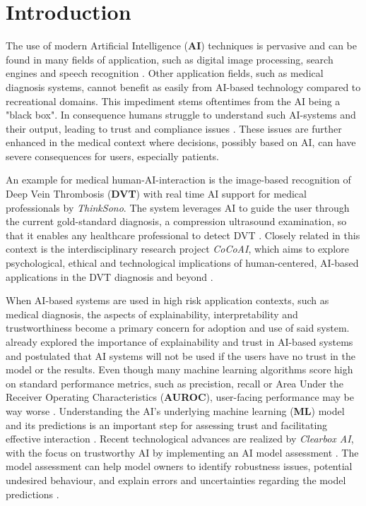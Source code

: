 \documentclass[11pt,a4paper,english]{scrreprt}
\begin{document}

\setlength{\parindent}{0em}
\setlength{\parskip}{1em}


\tableofcontents

\newpage
{}
\chapter{Introduction}\label{chapter:introduction}
The use of modern Artificial Intelligence (\textbf{AI}) techniques is pervasive and can be found in many fields of application, such as digital image processing, search engines and speech recognition \parencite{eu_com_ai}. Other application fields, such as medical diagnosis systems, cannot benefit as easily from AI-based technology compared to recreational domains. This impediment stems oftentimes from the AI being a "black box". In consequence humans struggle to understand such AI-systems and their output, leading to trust and compliance issues \parencite{adadi_blackbox_2018}. These issues are further enhanced in the medical context where decisions, possibly based on AI, can have severe consequences for users, especially patients.

An example for medical human-AI-interaction is the image-based recognition of Deep Vein Thrombosis (\textbf{DVT}) with real time AI support for medical professionals by \textit{Think\-Sono}. The system leverages AI to guide the user through the current gold-standard diagnosis, a compression ultrasound examination, so that it enables any healthcare professional to detect DVT \parencite{thinksono_website}. Closely related in this context is the interdisciplinary research project \textit{CoCoAI}, which aims to explore psychological, ethical and technological implications of human-centered, AI-based applications in the DVT diagnosis and beyond \parencite{cocoai_website}. 

When AI-based systems are used in high risk application contexts, such as medical diagnosis, the aspects of explainability, interpretability and trustworthiness become a primary concern for adoption and use of said system. \textcite{ribeiro_why_2016} already explored the importance of explainability and trust in AI-based systems and postulated that AI systems will not be used if the users have no trust in the model or the results. Even though many machine learning algorithms score high on standard performance metrics, such as precistion, recall or Area Under the Receiver Operating Characteristics (\textbf{AUROC}), user-facing performance may be way worse \parencite{gordon_disagreement_2021}. Understanding the AI's underlying machine learning (\textbf{ML}) model and its predictions is an important step for assessing trust and facilitating effective interaction \parencite{ribeiro_why_2016}. Recent technological advances are realized by \textit{Clearbox AI}, with the focus on trustworthy AI by implementing an AI model assessment \parencite{clearbox_website, eu_trustworthy_ai}. The model assessment can help model owners to identify robustness issues, potential undesired behaviour, and explain errors and uncertainties regarding the model predictions \parencite{clearbox_wp}.
\end{document}

